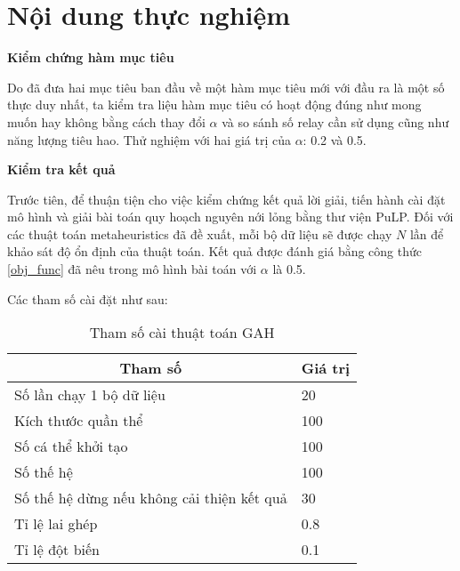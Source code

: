 \section{Nội dung thực nghiệm}
\textbf{Kiểm chứng hàm mục tiêu}

Do đã đưa hai mục tiêu ban đầu về một hàm mục tiêu mới với đầu ra là một số thực duy nhất, ta kiểm tra liệu hàm mục tiêu có hoạt động đúng như mong muốn hay không bằng cách thay đổi $\alpha$ và so sánh số relay cần sử dụng cũng như năng lượng tiêu hao. Thử nghiệm với hai giá trị của $\alpha$: 0.2 và 0.5.

\textbf{Kiểm tra kết quả}

Trước tiên, để thuận tiện cho việc kiểm chứng kết quả lời giải, tiến hành cài đặt mô hình và giải bài toán quy hoạch nguyên nới lỏng bằng thư viện PuLP. Đối với các thuật toán metaheuristics đã đề xuất, mỗi bộ dữ liệu sẽ được chạy $N$ lần để khảo sát độ ổn định của thuật toán. Kết quả được đánh giá bằng công thức \ref{obj_func} đã nêu trong mô hình bài toán với $\alpha$ là 0.5.

Các tham số cài đặt như sau:

\begin{table}[H]
    \begin{tabularx}{\textwidth}{|X|X|}
        \hline
        \multicolumn{1}{|c|}{\textbf{Tham số}} & \multicolumn{1}{c|}{\textbf{Giá trị}}                    \\ \hline
        Số lần chạy 1 bộ dữ liệu  &  20                                                 \\ \hline
        Kích thước quần thể  & 100                                                      \\ \hline
        Số cá thể khởi tạo & 100                                                        \\ \hline
        Số thế hệ & 100                                                                 \\ \hline
        Số thế hệ dừng nếu không cải thiện kết quả & 30                                 \\ \hline
        Tỉ lệ lai ghép & 0.8                                                            \\ \hline
        Tỉ lệ đột biến   & 0.1                                                          \\ \hline
    \end{tabularx}
    \caption{Tham số cài thuật toán GAH}
\end{table}

